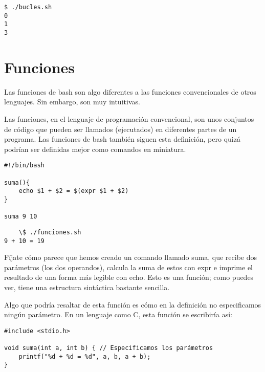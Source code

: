 \begin{tcolorbox-code}
\begin{lstlisting}
$ ./bucles.sh
0
1
3
\end{lstlisting}
\end{tcolorbox-code}

\section{Funciones}
Las funciones de bash son algo diferentes a las funciones convencionales de otros lenguajes. Sin embargo, son muy intuitivas.

Las funciones, en el lenguaje de programación convencional, son unos conjuntos de código que pueden ser llamados (ejecutados) en diferentes partes de un programa. Las funciones de bash también siguen esta definición, pero quizá podrían ser definidas mejor como comandos en miniatura.

\begin{tcolorbox-code}
\begin{lstlisting}
#!/bin/bash

suma(){
	echo $1 + $2 = $(expr $1 + $2)
}

suma 9 10
\end{lstlisting}
\end{tcolorbox-code}

\begin{tcolorbox-code}
\begin{lstlisting}
    \$ ./funciones.sh
9 + 10 = 19
\end{lstlisting}
\end{tcolorbox-code}

Fíjate cómo parece que hemos creado un comando llamado suma, que recibe dos parámetros (los dos operandos), calcula la suma de estos con expr e imprime el resultado de una forma más legible con echo. Esto es una función; como puedes ver, tiene una estructura sintáctica bastante sencilla.

Algo que podría resaltar de esta función es cómo en la definición no especificamos ningún parámetro. En un lenguaje como C, esta función se escribiría así:

\begin{tcolorbox-code}
\begin{lstlisting}
#include <stdio.h>

void suma(int a, int b) { // Especificamos los parámetros
	printf("%d + %d = %d", a, b, a + b);
}
\end{lstlisting}
\end{tcolorbox-code}

